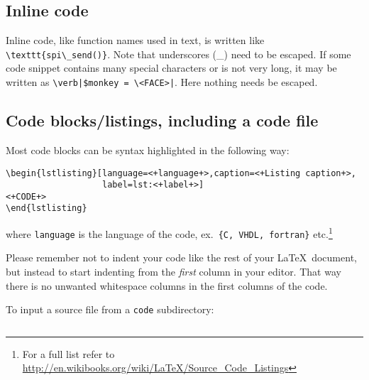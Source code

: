 \subsection{Inline code}
Inline code, like function names used in text, is written like \verb|\texttt{spi\_send()}|. Note that underscores (\_) need to be escaped. If some code snippet contains many special characters or is not very long, it may be written as \verb#\verb|$monkey = \<FACE>|#. Here nothing needs be escaped.


\subsection{Code blocks\slash listings, including a code file}
Most code blocks can be syntax highlighted in the following way:
\begin{verbatim}
\begin{lstlisting}[language=<+language+>,caption=<+Listing caption+>, 
                   label=lst:<+label+>]
<+CODE+>
\end{lstlisting}
\end{verbatim}
where \texttt{language} is the language of the code, ex.\ \texttt{\{C, VHDL, fortran\}} etc.\footnote{For a full list refer to \url{http://en.wikibooks.org/wiki/LaTeX/Source_Code_Listings}}


Please remember not to indent your code like the rest of your \LaTeX\ document, but instead to start indenting from the \emph{first} column in your editor. That way there is no unwanted whitespace columns in the first columns of the code.


To input a source file from a \texttt{code} subdirectory:
\begin{verbatim}

\end{verbatim}



